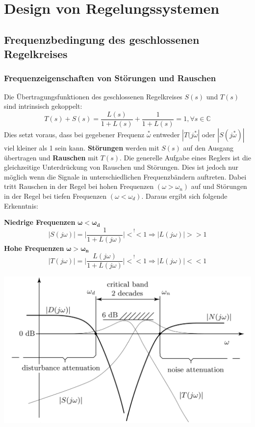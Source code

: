 \vfill\null\columnbreak
\section{Design von Regelungssystemen}
    \subsection{Frequenzbedingung des geschlossenen Regelkreises}
        \subsubsection{Frequenzeigenschaften von Störungen und Rauschen}
            Die Übertragungsfunktionen des geschlossenen Regelkreises $S(s)$ und $T(s)$ sind intrinsisch gekoppelt:
            \[T(s) + S(s) = \frac{L(s)}{1+L(s)}+\frac{1}{1+L(s)}=1,\forall s\in\mathbb{C}\]
            Dies setzt voraus, dass bei gegebener Frequenz $\overset{*}{\omega}$ entweder $|T(j\overset{*}{\omega}|$ oder $|S(j\overset{*}{\omega})|$ viel kleiner als 1 sein kann.
            \textbf{Störungen} werden mit $S(s)$ auf den Ausgang übertragen und \textbf{Rauschen} mit $T(s)$.
            Die generelle Aufgabe eines Reglers ist die gleichzeitige Unterdrückung von Rauschen und Störungen. Dies ist jedoch nur möglich wenn die Signale in unterschiedlichen Frequenzbändern auftreten. Dabei tritt Rauschen in der Regel bei hohen Frequenzen $(\omega>\omega_n)$ auf und Störungen in der Regel bei tiefen Frequenzen $(\omega<\omega_d)$. Daraus ergibt sich folgende Erkenntnis:
        
            \textbf{Niedrige Frequenzen} $\boldsymbol{\omega<\omega_d}$
            \[|S(j\omega)| = \bigg|\frac{1}{1+L(j\omega)}\bigg|  \overset{!}{<<} 1 \Rightarrow 
            |L(j\omega)| >> 1 \]
            \textbf{Hohe Frequenzen} $\boldsymbol{\omega > \omega_n}$
            \[|T(j\omega)| = \bigg|\frac{L(j\omega)}{1+L(j\omega)}\bigg|  \overset{!}{<<} 1 \Rightarrow 
            |L(j\omega)| << 1 \]
       
            \includegraphics[width = \linewidth]{images/08/Stoerung_und_Rauschen.jpg}
